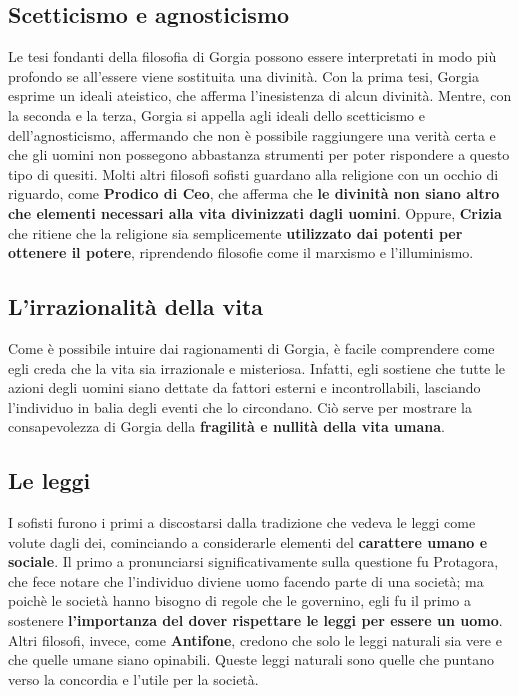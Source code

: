 \documentclass[10pt,a4paper]{article}
\begin{document}
	\subsection{Scetticismo e agnosticismo}
	
	Le tesi fondanti della filosofia di Gorgia possono essere interpretati in modo più profondo se all'essere viene sostituita una divinità. Con la prima tesi, Gorgia esprime un ideali ateistico, che afferma l'inesistenza di alcun divinità. Mentre, con la seconda e la terza, Gorgia si appella agli ideali dello scetticismo e dell'agnosticismo, affermando che non è possibile raggiungere una verità certa e che gli uomini non possegono abbastanza strumenti per poter rispondere a questo tipo di quesiti. Molti altri filosofi sofisti guardano alla religione con un occhio di riguardo, come \textbf{Prodico di Ceo}, che afferma che \textbf{le divinità non siano altro che elementi necessari alla vita divinizzati dagli uomini}. Oppure, \textbf{Crizia} che ritiene che la religione sia semplicemente \textbf{utilizzato dai potenti per ottenere il potere}, riprendendo filosofie come il marxismo e l'illuminismo.
	
	\subsection{L'irrazionalità della vita}
	
	Come è possibile intuire dai ragionamenti di Gorgia, è facile comprendere come egli creda che la vita sia irrazionale e misteriosa. Infatti, egli sostiene che tutte le azioni degli uomini siano dettate da fattori esterni e incontrollabili, lasciando l'individuo in balia degli eventi che lo circondano. Ciò serve per mostrare la consapevolezza di Gorgia della \textbf{fragilità e nullità della vita umana}.
	
	\subsection{Le leggi}
	
	I sofisti furono i primi a discostarsi dalla tradizione che vedeva le leggi come volute dagli dei, cominciando a considerarle elementi del \textbf{carattere umano e sociale}. Il primo a pronunciarsi significativamente sulla questione fu Protagora, che fece notare che l'individuo diviene uomo facendo parte di una società; ma poichè le società hanno bisogno di regole che le governino, egli fu il primo a sostenere \textbf{l'importanza del dover rispettare le leggi per essere un uomo}. Altri filosofi, invece, come \textbf{Antifone}, credono che solo le leggi naturali sia vere e che quelle umane siano opinabili. Queste leggi naturali sono quelle che puntano verso la concordia e l'utile per la società. 
	
\end{document}
